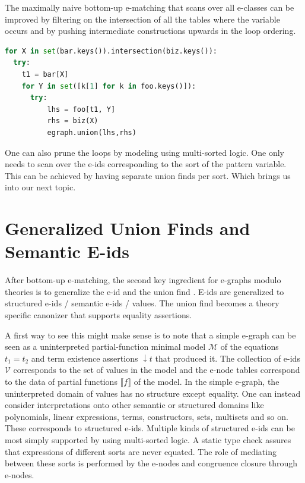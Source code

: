 \documentclass[sigconf]{acmart}
\begin{document}

The maximally naive bottom-up e-matching that scans over all e-classes can be improved by filtering on the intersection of all the tables where the variable occurs and by pushing intermediate constructions upwards in the loop ordering. 

\begin{lstlisting}[language=python]
for X in set(bar.keys()).intersection(biz.keys()):
  try:
    t1 = bar[X]
    for Y in set([k[1] for k in foo.keys()]):
      try:
          lhs = foo[t1, Y]
          rhs = biz(X)
          egraph.union(lhs,rhs)
\end{lstlisting}

One can also prune the loops by modeling using multi-sorted logic. One only needs to scan over the e-ids corresponding to the sort of the pattern variable. This can be achieved by having separate union finds per sort. Which brings us into our next topic.

\section {Generalized Union Finds and Semantic E-ids}

After bottom-up e-matching, the second key ingredient for e-graphs modulo theories is to generalize the e-id and the union find \cite{grobneregraph}. E-ids are generalized to structured e-ids / semantic e-ids / values. The union find becomes a theory specific canonizer that supports equality assertions.

A first way to see this might make sense is to note that a simple e-graph can be seen as a uninterpreted partial-function minimal model $\mathcal{M}$ of the equations $t_1 = t_2$ and term existence assertions $\downarrow t$ that produced it. The collection of e-ids $\mathcal{V}$ corresponds to the set of values in the model and the e-node tables correspond to the data of partial functions $\lBrack f \rBrack$ of the model. In the simple e-graph, the uninterpreted domain of values has no structure except equality. One can instead consider interpretations onto other semantic or structured domains like polynomials, linear expressions, terms, constructors, sets, multisets and so on. These corresponds to structured e-ids. Multiple kinds of structured e-ids can be most simply supported by using multi-sorted logic. A static type check assures that expressions of different sorts are never equated. The role of mediating between these sorts is performed by the e-nodes and congruence closure through e-nodes.
\end{document}
